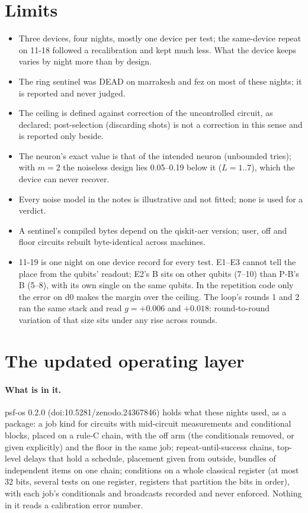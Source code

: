 \documentclass[10pt,a4paper]{article}
\begin{document}
\section{Limits}\label{sec:limits}
\begin{itemize}
\item Three devices, four nights, mostly one device per test; the same-device repeat on 11-18 followed a recalibration and
kept much less. What the device keeps varies by night more than by design.
\item The ring sentinel was DEAD on marrakesh and fez on most of these nights; it is reported and never judged.
\item The ceiling is defined against correction of the uncontrolled circuit, as declared; post-selection (discarding
shots) is not a correction in this sense and is reported only beside.
\item The neuron's exact value is that of the intended neuron (unbounded tries); with $m = 2$ the noiseless design lies
0.05--0.19 below it ($L = 1..7$), which the device can never recover.
\item Every noise model in the notes is illustrative and not fitted; none is used for a verdict.
\item A sentinel's compiled bytes depend on the qiskit-aer version; user, off and floor circuits rebuilt byte-identical
across machines.
\item 11-19 is one night on one device record for every test. E1--E3 cannot tell the place from the qubits' readout;
E2's B sits on other qubits (7--10) than P-B's B (5--8), with its own single on the same qubits. In the repetition code
only the error on d0 makes the margin over the ceiling. The loop's rounds 1 and 2 ran the same stack and read $g =
+0.006$ and $+0.018$: round-to-round variation of that size sits under any rise across rounds.
\end{itemize}

\section{The updated operating layer}\label{sec:update}
\paragraph{What is in it.} psf-os 0.2.0 (doi:10.5281/zenodo.24367846) holds what these nights used, as a package: a job kind for
circuits with mid-circuit measurements and conditional blocks, placed on a rule-C chain, with the off arm (the
conditionals removed, or given explicitly) and the floor in the same job; repeat-until-success chains, top-level delays
that hold a schedule, placement given from outside, bundles of independent items on one chain; conditions on a whole
classical register (at most 32 bits, several tests on one register, registers that partition the bits in order), with
each job's conditionals and broadcasts recorded and never enforced. Nothing in it reads a calibration error number.
\end{document}
